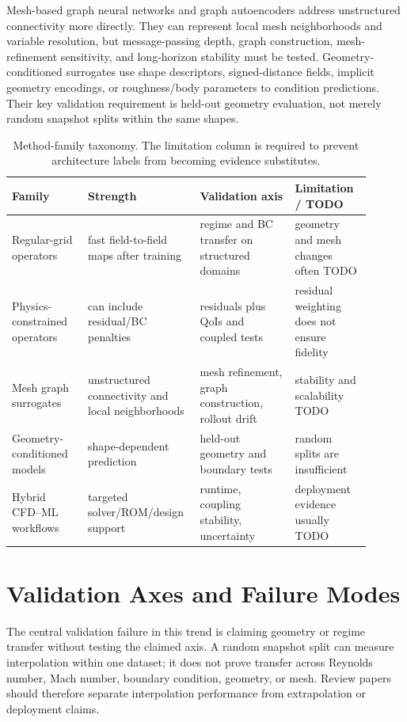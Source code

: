 \documentclass[11pt]{article}
\begin{document}
Mesh-based graph neural networks and graph autoencoders address unstructured connectivity more directly. They can represent local mesh neighborhoods and variable resolution, but message-passing depth, graph construction, mesh-refinement sensitivity, and long-horizon stability must be tested. Geometry-conditioned surrogates use shape descriptors, signed-distance fields, implicit geometry encodings, or roughness/body parameters to condition predictions. Their key validation requirement is held-out geometry evaluation, not merely random snapshot splits within the same shapes.

\begin{table}[t]
\centering
\caption{Method-family taxonomy. The limitation column is required to prevent architecture labels from becoming evidence substitutes.}
\begin{tabular}{p{0.20\linewidth}p{0.25\linewidth}p{0.25\linewidth}p{0.20\linewidth}}
\toprule
Family & Strength & Validation axis & Limitation / TODO \\
\midrule
Regular-grid operators & fast field-to-field maps after training & regime and BC transfer on structured domains & geometry and mesh changes often TODO \\
Physics-constrained operators & can include residual/BC penalties & residuals plus QoIs and coupled tests & residual weighting does not ensure fidelity \\
Mesh graph surrogates & unstructured connectivity and local neighborhoods & mesh refinement, graph construction, rollout drift & stability and scalability TODO \\
Geometry-conditioned models & shape-dependent prediction & held-out geometry and boundary tests & random splits are insufficient \\
Hybrid CFD--ML workflows & targeted solver/ROM/design support & runtime, coupling stability, uncertainty & deployment evidence usually TODO \\
\bottomrule
\end{tabular}
\end{table}

\section{Validation Axes and Failure Modes}
The central validation failure in this trend is claiming geometry or regime transfer without testing the claimed axis. A random snapshot split can measure interpolation within one dataset; it does not prove transfer across Reynolds number, Mach number, boundary condition, geometry, or mesh. Review papers should therefore separate interpolation performance from extrapolation or deployment claims.
\end{document}
